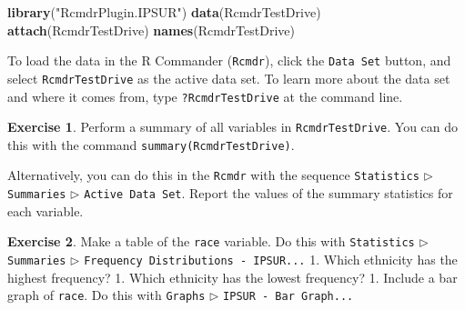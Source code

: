 \documentclass[]{book}
\newenvironment{Shaded}{\begin{snugshade}}{\end{snugshade}}
\newcommand{\KeywordTok}[1]{\textcolor[rgb]{0.13,0.29,0.53}{\textbf{{#1}}}}
\newcommand{\StringTok}[1]{\textcolor[rgb]{0.31,0.60,0.02}{{#1}}}
\newcommand{\NormalTok}[1]{{#1}}
\numberwithin{equation}{chapter}
\numberwithin{figure}{chapter}
\theoremstyle{plain}
\theoremstyle{definition}
\newtheorem{xca}{Exercise}[chapter]
\theoremstyle{remark}
\theoremstyle{definition}
\theoremstyle{definition}
\theoremstyle{remark}
\begin{document}
\begin{Shaded}
\begin{Highlighting}[]
\KeywordTok{library}\NormalTok{(}\StringTok{"RcmdrPlugin.IPSUR"}\NormalTok{)}
\KeywordTok{data}\NormalTok{(RcmdrTestDrive)}
\KeywordTok{attach}\NormalTok{(RcmdrTestDrive)}
\KeywordTok{names}\NormalTok{(RcmdrTestDrive)}
\end{Highlighting}
\end{Shaded}

To load the data in the R Commander (\texttt{Rcmdr}), click the
\texttt{Data\ Set} button, and select \texttt{RcmdrTestDrive} as the
active data set. To learn more about the data set and where it comes
from, type \texttt{?RcmdrTestDrive} at the command line.

\begin{xca}
Perform a summary of all variables in \texttt{RcmdrTestDrive}. You can
do this with the command \texttt{summary(RcmdrTestDrive)}.

Alternatively, you can do this in the \texttt{Rcmdr} with the sequence
\texttt{Statistics} \(\triangleright\) \texttt{Summaries}
\(\triangleright\) \texttt{Active\ Data\ Set}. Report the values of the
summary statistics for each variable.
\end{xca}

\bigskip

\begin{xca}
Make a table of the \texttt{race} variable. Do this with
\texttt{Statistics} \(\triangleright\) \texttt{Summaries}
\(\triangleright\) \texttt{Frequency\ Distributions\ -\ IPSUR...} 1.
Which ethnicity has the highest frequency? 1. Which ethnicity has the
lowest frequency? 1. Include a bar graph of \texttt{race}. Do this with
\texttt{Graphs} \(\triangleright\) \texttt{IPSUR\ -\ Bar\ Graph...}
\end{xca}

\bigskip
\end{document}
